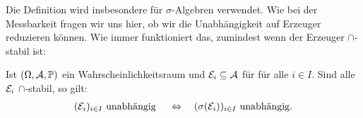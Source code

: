 Die Definition wird insbesondere f\"ur $\sigma$-Algebren verwendet. Wie bei der Messbarkeit fragen wir uns hier, ob wir die Unabh\"angigkeit auf Erzeuger reduzieren k\"onnen. Wie immer funktioniert das, zumindest wenn der Erzeuger $\cap$-stabil ist:
\begin{prop}\label{unabh}
	Ist $(\Omega, \mathcal{A}, \mathbb{P})$ ein Wahrscheinlichkeitsraum und $\mathcal{E}_i \subseteq \mathcal{A}$ für f\"ur alle $i \in I$. Sind alle $\mathcal{E}_i$ $\cap$-stabil, so gilt:
	\begin{align*}
		(\mathcal{E}_i)_{i\in I}\text{ unabhängig }\quad \Leftrightarrow\quad  (\sigma(\mathcal{E}_i))_{i \in I}\text{ unabhängig.}
	\end{align*}
\end{prop}

